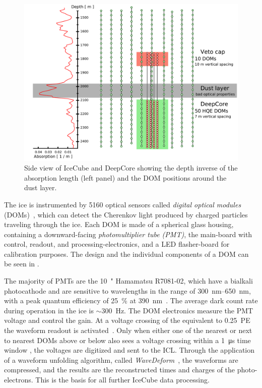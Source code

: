 \begin{figure}[h]
    \includegraphics{figures/icecube_deepcore/DeepCore_sideview.pdf}
	\caption[IceCube side view]{Side view of IceCube and DeepCore showing the depth inverse of the absorption length (left panel) and the DOM positions around the dust layer.}
\end{figure}

The ice is instrumented by 5160 optical sensors called \textit{digital optical modules} (DOMs)~, which can detect the Cherenkov light produced by charged particles traveling through the ice. Each DOM is made of a spherical glass housing, containing a downward-facing \textit{photomultiplier tube (PMT)}, the main-board with control, readout, and processing-electronics, and a LED flasher-board for calibration purposes. The design and the individual components of a DOM can be seen in .

The majority of PMTs are the \SI{10}{"} Hamamatsu R7081-02, which have a bialkali photocathode and are sensitive to wavelengths in the range of \SIrange{300}{650}{\nano\meter}, with a peak quantum efficiency of \SI{25}{\percent} at \SI{390}{\nano\meter}~. The average dark count rate during operation in the ice is $\sim$\SI{300}{\hertz}. The DOM electronics measure the PMT voltage and control the gain. At a voltage crossing of the equivalent to \SI{0.25}{PE} the waveform readout is activated~. Only when either one of the nearest or next to nearest DOMs above or below also sees a voltage crossing within a \SI{1}{\micro\second} time window , the voltages are digitized and sent to the ICL. Through the application of a waveform unfolding algorithm, called \textit{WaveDeform}~, the waveforms are compressed, and the results are the reconstructed times and charges of the photo-electrons. This is the basis for all further IceCube data processing.

